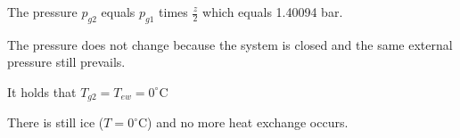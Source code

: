 The pressure \( p_{g2} \) equals \( p_{g1} \) times \( \frac{z}{2} \) which equals 1.40094 bar.

The pressure does not change because the system is closed and the same external pressure still prevails.

It holds that \( T_{g2} = T_{ew} = 0^\circ \text{C} \)

There is still ice (\(T = 0^\circ \text{C}\)) and no more heat exchange occurs.